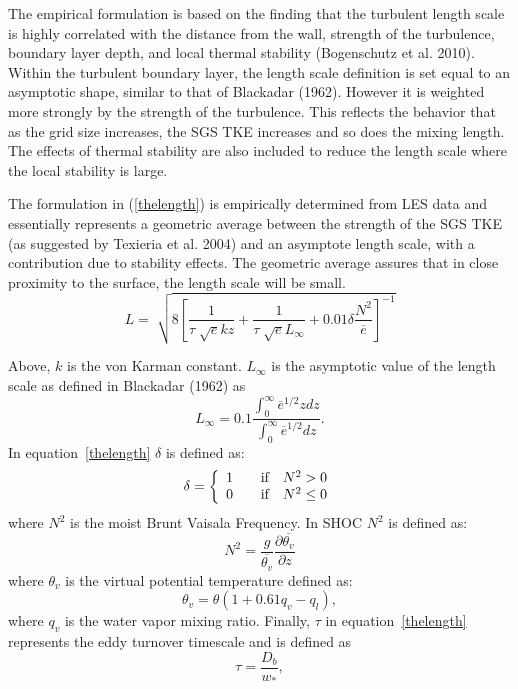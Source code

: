 \documentclass[12pt,titlepage]{article}
\numberwithin{equation}{section}
\begin{document}
The empirical formulation is based on the finding that the turbulent length scale is highly correlated with the distance from the wall, strength of the turbulence, boundary layer depth, and local thermal stability (Bogenschutz et al. 2010).  Within the turbulent boundary layer, the length scale definition is set equal to an asymptotic shape, similar to that of Blackadar (1962).  However it is weighted more strongly by the strength of the turbulence.  This reflects the behavior that as the grid size increases, the SGS TKE increases and so does the mixing length.  The effects of thermal stability are also included to reduce the length scale where the local stability is large.  

The formulation in (\ref{thelength}) is empirically determined from LES data and essentially represents a geometric average between the strength of the SGS TKE (as suggested by Texieria et al. 2004) and an asymptote length scale, with a contribution due to stability effects.  The geometric average assures that in close proximity to the surface, the length scale will be small.  
%
\begin{equation}
  L=\sqrt[]{8\left[\frac{1}{\tau\sqrt[]{e}kz}+\frac{1}{\tau\sqrt[]{e}L_{\infty}}+0.01\delta\frac{N^{2}}{\overline{e}}\right]^{-1}}
  \label{thelength}
\end{equation}

Above, $k$ is the von Karman constant.  $L_{\infty}$ is the asymptotic value of the length scale as defined in Blackadar (1962) as
%
 \begin{equation}
  L_{\infty}=0.1\frac{\int_{0}^{\infty}\overline{e}^{1/2}z dz}{\int_{0}^{\infty} \overline{e}^{1/2} dz}. 
  \end{equation}
   In equation~\ref{thelength} $\delta$ is defined as:
\[
\delta = \left\{ 
\begin{array}{l l}
  1 & \quad \text{if} \quad N^{2} > 0 \\
  0 & \quad \text{if} \quad N^{2} \le 0 \\
\end{array} \right.
\]     
%
where $N^{2}$ is the moist Brunt Vaisala Frequency.  In SHOC $N^{2}$ is defined as:
%
\begin{equation}
  N^{2} = \frac{g}{\overline{\theta_{v}}}\frac{\partial{\overline{\theta_{v}}}}{\partial{z}}
  \label{brunt}
\end{equation}
%
where $\theta_{v}$ is the virtual potential temperature defined as:
%
\begin{equation}
  \theta_{v}=\theta(1 + 0.61q_{v} - q_{l}) , 
  \label{thetav}
\end{equation}
%
where $q_{v}$ is the water vapor mixing ratio. 
%
Finally, $\tau$ in equation~\ref{thelength} represents the eddy turnover timescale and is defined as
%
\begin{equation}
  \tau = \frac{D_{b}}{w_{*}},
  \label{conv_scale}
\end{equation} 
\end{document}
